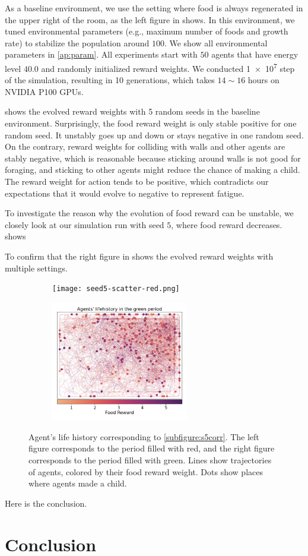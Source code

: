 As a baseline environment, we use the setting where food is always regenerated in the upper right of the room, as the left figure in  shows. In this environment, we tuned environmental parameters (e.g., maximum number of foods and growth rate) to stabilize the population around $100$. We show all environmental parameters in \cref{ap:param}. All experiments start with $50$ agents that have energy level $40.0$ and randomly initialized reward weights. We conducted \num{1e7} step of the simulation, resulting in 10  generations, which takes $14\sim16$ hours on NVIDIA P100 GPUs.

 shows the evolved reward weights with 5 random seeds in the baseline environment. Surprisingly, the food reward weight is only stable positive for one random seed. It unstably goes up and down or stays negative in one random seed. On the contrary, reward weights for colliding with walls and other agents are stably negative, which is reasonable because sticking around walls is not good for foraging, and sticking to other agents might reduce the chance of making a child. The reward weight for action tends to be positive, which contradicts our expectations that it would evolve to negative to represent fatigue.

To investigate the reason why the evolution of food reward can be unstable, we closely look at our simulation run with seed $5$, where food reward decreases.  shows

To confirm that
the right figure in  shows the evolved reward weights with multiple settings.

\begin{figure}[t]
  \begin{subfigure}[t]{6cm}
    \centering
    \texttt{[image: seed5-scatter-red.png]}
  \end{subfigure}
  \begin{subfigure}[t]{6cm}
    \centering
    \includegraphics[width=6cm]{resources/seed5-scatter-green.png}
  \end{subfigure}
  \caption{
    Agent's life history corresponding to \cref{subfigure:s5corr}. The left figure corresponds to the period filled with red, and the right figure corresponds to the period filled with green. Lines show trajectories of agents, colored by their food reward weight. Dots show places where agents made a child.
  }\label{figure:baseline-result}
\end{figure}

Here is the conclusion.


\section{Conclusion}